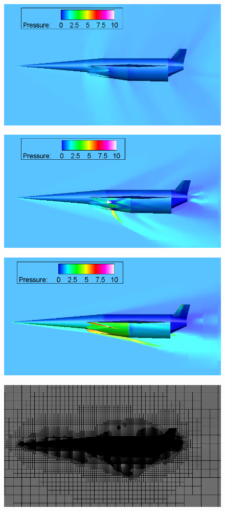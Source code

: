 \begin{figure}
	\centering
	\includegraphics[width=0.7\linewidth]{figures/3_vehicle_design/M1p1AoA6}
	\caption{}
	\label{fig:M1}
\end{figure}
\begin{figure}
	\centering
	\includegraphics[width=0.7\linewidth]{figures/3_vehicle_design/M3AoA6}
	\caption{}
	\label{fig:M3AoA6}
\end{figure}
\begin{figure}
	\centering
	\includegraphics[width=0.7\linewidth]{figures/3_vehicle_design/M7AoA6}
	\caption{}
	\label{fig:M7AoA6}
\end{figure}

\begin{figure}
\centering
\includegraphics[width=0.7\linewidth]{figures/3_vehicle_design/M3AoA6GRID}
\caption{}
\label{fig:M3AoA6GRID}
\end{figure}


